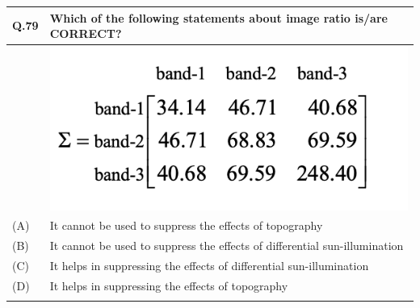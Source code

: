 \documentclass[12pt]{article}
\begin{document}
\begin{table}[H]
\renewcommand{\arraystretch}{3}
\setlength{\tabcolsep}{8pt}
\begin{tabular}{|l|p{15cm}|}
\hline
 
Q.79&Which of the following statements about image ratio is/are CORRECT?\\ \hline 
&  \includegraphics[scale=1]{LatexImage10.png}\\ \hline
(A)&It cannot be used to suppress the effects of topography\\ \hline
(B)&It cannot be used to suppress the effects of differential sun-illumination\\ \hline
(C)&It helps in suppressing the effects of differential sun-illumination\\ \hline
(D)&It helps in suppressing the effects of topography\\ \hline
& \\ \hline
\end{tabular}
\end{table} 
\newpage
\end{document}
